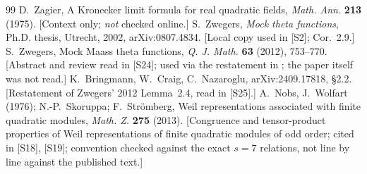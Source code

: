 \documentclass[11pt]{article}
\theoremstyle{definition}
\newcommand{\src}[1]{\textup{[S#1]}}
\begin{document}
\begin{thebibliography}{99}
 D.~Zagier, A Kronecker limit formula for real quadratic fields, \emph{Math. Ann.} \textbf{213} (1975). [Context only; \emph{not} checked online.]
 S.~Zwegers, \emph{Mock theta functions}, Ph.D. thesis, Utrecht, 2002, arXiv:0807.4834. [Local copy used in \src{2}; Cor.~2.9.]
 S.~Zwegers, Mock Maass theta functions, \emph{Q. J. Math.} \textbf{63} (2012), 753--770. [Abstract and review read in \src{24}; used via the restatement in \cite{BCN}; the paper itself was not read.]
 K.~Bringmann, W.~Craig, C.~Nazaroglu, arXiv:2409.17818, \S2.2. [Restatement of Zwegers' 2012 Lemma~2.4, read in \src{25}.]
 A.~Nobs, J.~Wolfart (1976); N.-P.~Skoruppa; F.~Str\"omberg, Weil representations associated with finite quadratic modules, \emph{Math. Z.} \textbf{275} (2013). [Congruence and tensor-product properties of Weil representations of finite quadratic modules of odd order; cited in \src{18}, \src{19}; convention checked against the exact $s=7$ relations, not line by line against the published text.]
\end{thebibliography}
\end{document}
